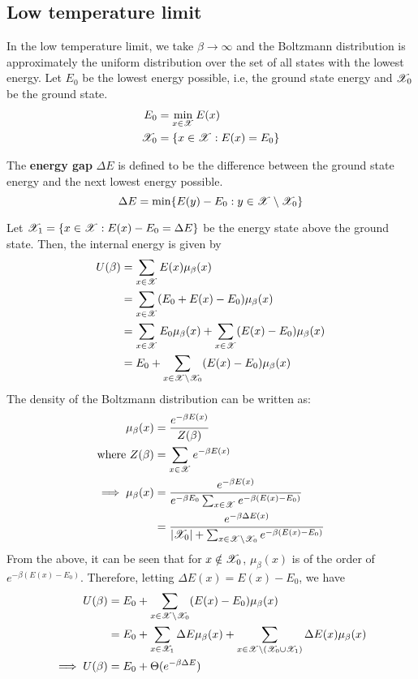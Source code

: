 \documentclass[letterpaper,english,10pt]{article}
\begin{document}
\subsection{Low temperature limit}
In the low temperature limit, we take $\beta \rightarrow \infty$ and the Boltzmann distribution is approximately the uniform distribution over the set of all states with the lowest energy. Let $E_0$ be the lowest energy possible, i.e, the ground state energy and $\mathscr{X}_0$ be the ground state.
\begin{align}
E_0 &= \min_{x \in \mathscr{X}} E(x) \\
\mathscr{X}_0 &= \{ x \in \mathscr{X} : E(x) = E_0 \}
\end{align}
\begin{defn}
The \textbf{energy gap} $\Delta E$ is defined to be the difference between the ground state energy and the next lowest energy possible.
\begin{equation}
\Delta E = \min \{ E(y) - E_0 : y \in \mathscr{X} \setminus \mathscr{X}_0 \}
\end{equation}
\end{defn}
Let $\mathscr{X}_1 = \{ x \in \mathscr{X} : E(x) - E_0 = \Delta E \}$ be the energy state above the ground state. Then, the internal energy is given by
\begin{align}
U(\beta) &= \sum_{x \in \mathscr{X}} E(x) \mu_\beta (x) \nonumber \\
	&= \sum_{x \in \mathscr{X}} (E_0 + E(x) - E_0) \mu_\beta (x) \nonumber \\
	&= \sum_{x \in \mathscr{X}} E_0 \mu_\beta (x) + \sum_{x \in \mathscr{X}} (E(x) - E_0) \mu_\beta (x) \nonumber \\
	&= E_0 + \sum_{x \in \mathscr{X} \setminus \mathscr{X}_0} (E(x) - E_0) \mu_\beta (x)
\end{align}
The density of the Boltzmann distribution can be written as:
\begin{align}
\mu_\beta(x) &= \frac{e^{-\beta E(x)}}{Z(\beta)} \nonumber \\
\text{where } Z(\beta) &= \sum_{x \in \mathscr{X}} e^{-\beta E(x)} \nonumber \\
\implies \mu_\beta (x) &= \frac{e^{-\beta E(x)}}{e^{-\beta E_0}\sum_{x \in \mathscr{X}} e^{-\beta (E(x)-E_0)}} \nonumber \\
	&= \frac{e^{-\beta \Delta E(x)}}{|\mathscr{X}_0| + \sum_{x \in \mathscr{X} \setminus \mathscr{X}_0} e^{-\beta (E(x)-E_0)}} \nonumber
\end{align}
From the above, it can be seen that for $x \notin \mathscr{X}_0$, $\mu_\beta(x)$ is of the order of $e^{-\beta(E(x) - E_0)}$. Therefore, letting $\Delta E(x) = E(x) - E_0$, we have
\begin{align}
U(\beta) &= E_0 + \sum_{x \in \mathscr{X} \setminus \mathscr{X}_0} (E(x) - E_0) \mu_\beta (x) \nonumber \\
	&= E_0 + \sum_{x \in \mathscr{X}_1} \Delta E \mu_\beta (x) + \sum_{x \in \mathscr{X} \setminus (\mathscr{X}_0 \cup \mathscr{X}_1)} \Delta E(x) \mu_\beta (x) \nonumber \\
\implies U(\beta) &= E_0 + \Theta(e^{-\beta \Delta E})
\end{align}
\end{document}
